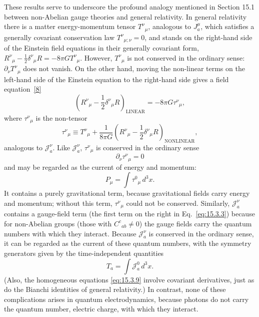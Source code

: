 These results serve to underscore the profound analogy mentioned in Section 15.1
between non-Abelian gauge theories and general relativity. In general relativity
there is a matter energy-momentum tensor $T^\nu{}_\mu$, analogous to
$J_a^\mu$, which satisfies a generally covariant conservation law
$T^\nu{}_{\mu;\nu}=0$, and stands on the right-hand side of the Einstein field
equations in their generally covariant form,
$R^\nu{}_\mu-\frac12\delta^\nu{}_\mu R=-8\pi G T^\nu{}_\mu$. However,
$T^\nu{}_\mu$ is not conserved in the ordinary sense:
$\partial_\nu T^\nu{}_\mu$ does not vanish. On the other hand, moving the
non-linear terms on the left-hand side of the Einstein equation to the right-hand
side gives a field equation~\hyperref[ch15-ref-8]{[8]}
\[
 \left(R^\nu{}_\mu-\frac12\delta^\nu{}_\mu R\right)_{\mathrm{LINEAR}}
 =-8\pi G\tau^\nu{}_\mu ,
\]
where $\tau^\nu{}_\mu$ is the non-tensor
\[
 \tau^\nu{}_\mu\equiv T^\nu{}_\mu
 +\frac{1}{8\pi G}
 \left(R^\nu{}_\mu-\frac12\delta^\nu{}_\mu R\right)_{\mathrm{NONLINEAR}} ,
\]
analogous to $\mathcal J_a^\nu$. Like $\mathcal J_a^\nu$,
$\tau^\nu{}_\mu$ is conserved in the ordinary sense
\[
 \partial_\nu\tau^\nu{}_\mu=0
\]
and may be regarded as the current of energy and momentum:
\[
 P_\mu=\int\tau^0{}_\mu\,d^3x .
\]
It contains a purely gravitational term, because gravitational fields carry
energy and momentum; without this term, $\tau^\nu{}_\mu$ could not be conserved.
Similarly, $\mathcal J_a^\nu$ contains a gauge-field term (the first term
on the right in Eq.~\eqref{eq:15.3.3}) because for non-Abelian groups (those with
$C^c{}_{ab}\ne0$) the gauge fields carry the quantum numbers with
which they interact. Because $\mathcal J_a^\nu$ is conserved in the
ordinary sense, it can be regarded as the current of these quantum numbers, with
the symmetry generators given by the time-independent quantities
\begin{equation}
 T_a=\int\mathcal J_a^0\,d^3x .
 \tag{15.3.10}\label{eq:15.3.10}
\end{equation}
(Also, the homogeneous equations \eqref{eq:15.3.9} involve covariant derivatives,
just as do the Bianchi identities of general relativity.) In contrast, none of
these complications arises in quantum electrodynamics, because photons do not
carry the quantum number, electric charge, with which they interact.
